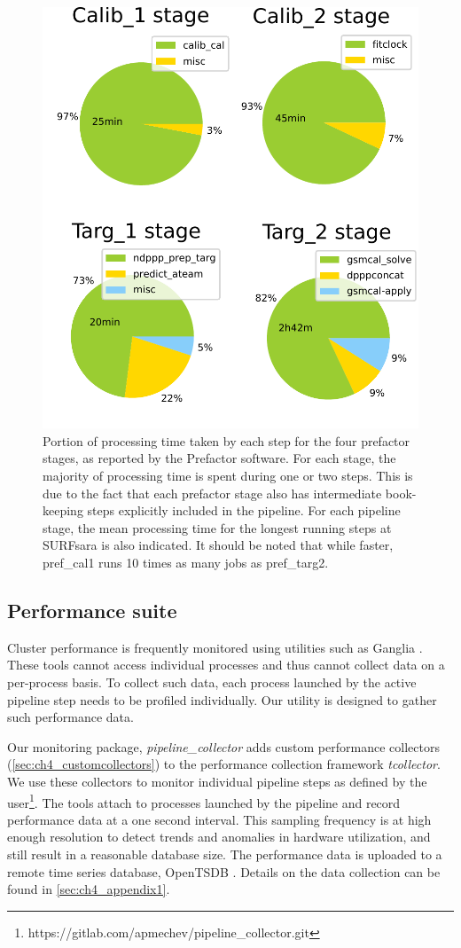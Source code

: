 \begin{figure}[H]
    \centering
    \includegraphics[width=0.5\linewidth]{ch4/figures/fig2/4pies.pdf}
      \caption[Portion of processing time taken by each step for the four prefactor stages.]{Portion of processing time taken by each step for the four prefactor stages, as reported by the Prefactor software. For each stage, the majority of processing time is spent during one or two steps. This is due to the fact that each prefactor stage also has intermediate book-keeping steps explicitly included in the pipeline. For each pipeline stage, the mean processing time for the longest running steps at SURFsara is also indicated. It should be noted that while faster, pref\_cal1 runs 10 times as many jobs as pref\_targ2. }
	\label{fig:ch4_4_steps_pies}
\end{figure}


\subsection{Performance suite}
Cluster performance is frequently monitored using utilities such as Ganglia \citep[][discussed in Section \ref{sec:ch4_related}]{ganglia}. These tools cannot access individual processes and thus cannot collect data on a per-process basis. To collect such data, each process launched by the active pipeline step needs to be profiled individually. Our utility is designed to gather such performance data.

Our monitoring package, \textit{pipeline\_collector} adds custom performance collectors (\ref{sec:ch4_customcollectors}) to the performance collection framework \textit{tcollector}. We use these collectors to monitor individual pipeline steps as defined by the user\footnote{https://gitlab.com/apmechev/pipeline\_collector.git}. The tools attach to processes launched by the pipeline and record performance data at a one second interval. This sampling frequency is at high enough resolution to detect trends and anomalies in hardware utilization, and still result in a reasonable database size. The performance data is uploaded to a remote time series database, OpenTSDB \citep{opentsdbsite}. Details on the data collection can be found in  \ref{sec:ch4_appendix1}.

